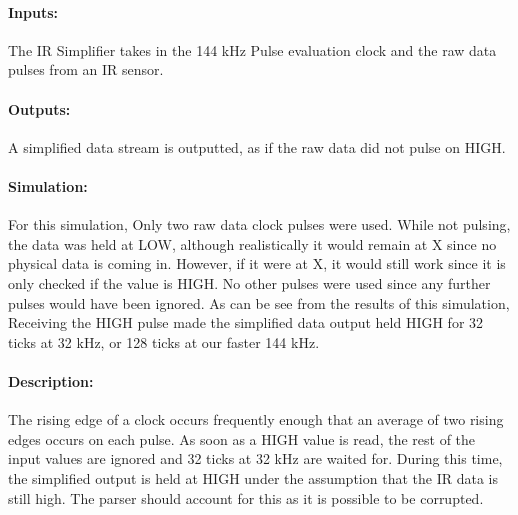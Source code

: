 \documentclass[]{article}
\begin{document}
\paragraph{Inputs:} The IR Simplifier takes in the 144 kHz Pulse evaluation clock and the raw data pulses from an IR sensor. 
\paragraph{Outputs:} A simplified data stream is outputted, as if the raw data did not pulse on HIGH.
\paragraph{Simulation:} For this simulation, Only two raw data clock pulses were used.
While not pulsing, the data was held at LOW, although realistically it would remain at X since no physical data is coming in.
However, if it were at X, it would still work since it is only checked if the value is HIGH. No other pulses were used since any further pulses would have been ignored.
As can be see from the results of this simulation, Receiving the HIGH pulse made the simplified data output held HIGH for 32 ticks at 32 kHz, or 128 ticks at our faster 144 kHz.
\paragraph{Description:} The rising edge of a clock occurs frequently enough that an average of two rising edges occurs on each pulse.
As soon as a HIGH value is read, the rest of the input values are ignored and 32 ticks at 32 kHz are waited for.
During this time, the simplified output is held at HIGH under the assumption that the IR data is still high.
The parser should account for this as it is possible to be corrupted.
\end{document}

